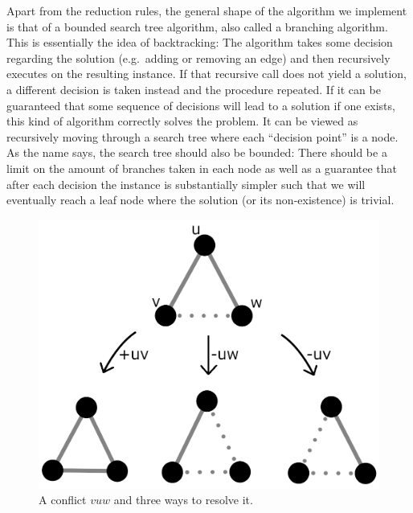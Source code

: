 \documentclass[12pt,oneside,english,parskip=full,headings=small]{scrbook}
\theoremstyle{definition}
\begin{document}
Apart from the reduction rules, the general shape of the algorithm we implement is that of a bounded
search tree algorithm, also called a branching algorithm. This is essentially the idea of
backtracking: The algorithm takes some decision regarding the solution (e.g.\ adding or removing an
edge) and then recursively executes on the resulting instance. If that recursive call does not yield
a solution, a different decision is taken instead and the procedure repeated. If it can be
guaranteed that some sequence of decisions will lead to a solution if one exists, this kind of
algorithm correctly solves the problem. It can be viewed as recursively moving through a search tree
where each ``decision point'' is a node. As the name says, the search tree should also be bounded:
There should be a limit on the amount of branches taken in each node as well as a guarantee that
after each decision the instance is substantially simpler such that we will eventually reach a leaf
node where the solution (or its non-existence) is trivial.

\begin{figure}[h]
	\centering
	\includegraphics[scale=0.5]{conflicts}
	\caption{A conflict $v u w$ and three ways to resolve it.}
	\label{fig:conflicts}
\end{figure}
\end{document}
